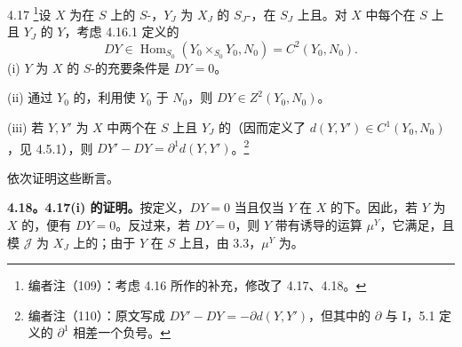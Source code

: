 \begin{SGAresult}{}{4.17}
\footnote{编者注（109）：考虑 4.16 所作的补充，修改了 4.17、4.18。}设 $X$ 为在 $S$ 上的 $S$-，$Y_J$ 为 $X_J$ 的 $S_J$-，在 $S_J$ 上且。对 $X$ 中每个在 $S$ 上且 $Y_J$ 的 $Y$，考虑 4.16.1 定义的
\[DY\in\operatorname{Hom}_{S_0}(Y_0\times_{S_0}Y_0,N_0)=C^2(Y_0,N_0).\]
(i) $Y$ 为 $X$ 的 $S$-的充要条件是 $DY=0$。

(ii) 通过 $Y_0$ 的，利用使 $Y_0$ 于 $N_0$，则 $DY\in Z^2(Y_0,N_0)$。

(iii) 若 $Y,Y'$ 为 $X$ 中两个在 $S$ 上且 $Y_J$ 的（因而定义了 $d(Y,Y')\in C^1(Y_0,N_0)$，见 4.5.1），则 $DY'-DY=\partial^1d(Y,Y')$。\footnote{编者注（110）：原文写成 $DY'-DY=-\partial d(Y,Y')$，但其中的 $\partial$ 与 I，5.1 定义的 $\partial^1$ 相差一个负号。}
\end{SGAresult}
依次证明这些断言。

\textbf{4.18。4.17(i) 的证明。}按定义，$DY=0$ 当且仅当 $Y$ 在 $X$ 的下。因此，若 $Y$ 为 $X$ 的，便有 $DY=0$。反过来，若 $DY=0$，则 $Y$ 带有诱导的运算 $\mu^Y$，它满足，且模 $\mathscr J$ 为 $X_J$ 上的；由于 $Y$ 在 $S$ 上且，由 3.3，$\mu^Y$ 为。

